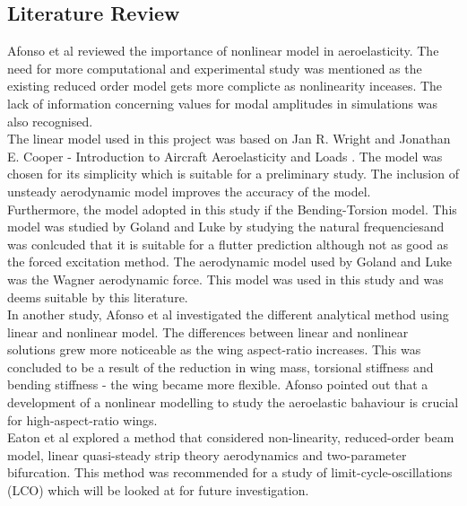 \documentclass[11pt]{article}
\begin{document}
\subsection{Literature Review}
\label{sec:lit-rev}
Afonso et al\cite{Afonso2017AWings} reviewed the importance of nonlinear model in aeroelasticity. The need for more computational and experimental study was mentioned as the existing reduced order model gets more complicte as nonlinearity inceases. The lack of information concerning values for modal amplitudes in simulations was also recognised.\\

The linear model used in this project was based on Jan R. Wright and Jonathan E. Cooper - Introduction to Aircraft Aeroelasticity and Loads \cite{Wright2015INTRODUCTIONLOADS}. The model was chosen for its simplicity which is suitable for a preliminary study. The inclusion of unsteady aerodynamic model improves the accuracy of the model.\\

Furthermore, the model adopted in this study if the Bending-Torsion model. This model was studied by Goland and Luke \cite{Goland1949AWings} by studying the natural frequenciesand was conlcuded that it is suitable for a flutter prediction although not as good as the forced excitation method. The aerodynamic model used by Goland and Luke was the Wagner aerodynamic force. This model was used in this study and was deems suitable by this literature.\\

In another study, Afonso et al \cite{Afonso2015LINEARWINGS} investigated the different analytical method using linear and nonlinear model. The differences between linear and nonlinear solutions grew more noticeable as the wing aspect-ratio increases. This was concluded to be a result of the reduction in wing mass, torsional stiffness and bending stiffness - the wing became more flexible. Afonso pointed out that a development of a nonlinear modelling to study the aeroelastic bahaviour is crucial for high-aspect-ratio wings.\\

Eaton et al \cite{EatonNumericalWings} explored a method that considered non-linearity, reduced-order beam model, linear quasi-steady strip theory aerodynamics and two-parameter bifurcation. This method was recommended for a study of limit-cycle-oscillations (LCO) which will be looked at for future investigation.\\
\end{document}
